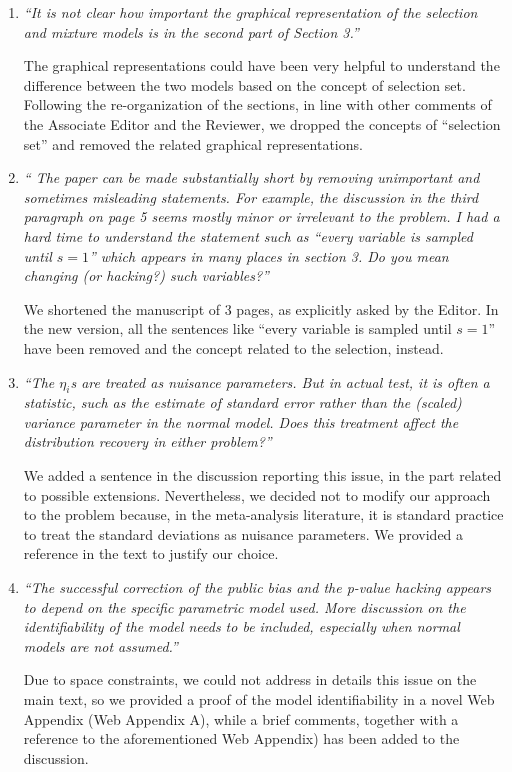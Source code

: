 \documentclass[11pt]{article}
\begin{document}
\begin{enumerate}
\item \emph{``It is not clear how important the graphical representation of the selection and mixture models is in the second part of Section 3.''}


The graphical representations could have been very helpful to understand the difference between the two models based on the concept of selection set. Following the re-organization of the sections, in line with other comments of the Associate Editor and the Reviewer, we dropped the concepts of ``selection set'' and removed the related graphical representations.


\item \emph{`` The paper can be made substantially short by removing unimportant and sometimes misleading statements. For example, the discussion in the third paragraph on page 5 seems mostly minor or irrelevant to the problem. I had a hard time to understand the statement such as ``every variable is sampled until $s = 1$'' which appears in many places in section 3. Do you mean changing (or hacking?) such variables?''}


We shortened the manuscript of 3 pages, as explicitly asked by the Editor. In the new version, all the sentences like ``every variable is sampled until $s = 1$'' have been removed and the concept related to the selection, instead.



\item \emph{``The $\eta_i$s are treated as nuisance parameters. But in actual test, it is often a statistic, such as the estimate of standard error rather than the (scaled) variance parameter in the normal model. Does this treatment affect the distribution recovery in either problem?''}

We added a sentence in the discussion reporting this issue, in the part related to possible extensions. Nevertheless, we decided not to modify our approach to the problem because, in the meta-analysis literature, it is standard practice to treat the standard deviations as nuisance parameters. We provided a reference in the text to justify our choice.

\item \emph{``The successful correction of the public bias and the p-value hacking appears to depend on the specific parametric model used. More discussion on the identifiability of the model needs to be included, especially when normal models are not assumed.''}

Due to space constraints, we could not address in details this issue on the main text, so we provided a proof of the model identifiability in a novel Web Appendix (Web Appendix A), while a brief comments, together with a reference to the aforementioned Web Appendix) has been added to the discussion.
\end{enumerate}
\end{document}
